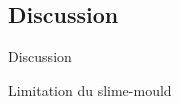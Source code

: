 
%
%
%
%


\subsection{Discussion}{Discussion}



Limitation du slime-mould \cite{adamatzky2010road}










